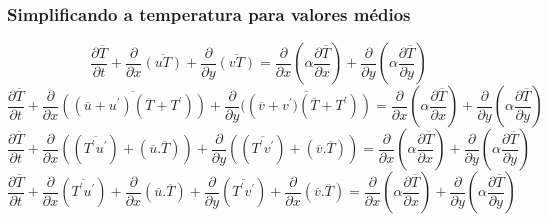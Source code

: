 \documentclass[xcolor=dvipsnames,10pt,aspectratio=169]{beamer}
\begin{document}
	
	
	
	
		\begin{frame}
		\frametitle{Simplificando a temperatura para valores médios}
		\begin{equation}
		\frac{\partial \overline{T}}{\partial t} + {\frac{\partial{}}{\partial{x}} \overline{(uT)}} + 
		{\frac{\partial{}}{\partial{y}} \overline{(vT)}} 
		=
		{\frac{\partial{}}{\partial{x}}} \left(\alpha {\frac{\partial{\overline{T}}}{\partial{x}}} \right) +
		{\frac{\partial{}}{\partial{y}}} \left(\alpha {\frac{\partial{\overline{T}}}{\partial{y}}} \right) 
		\end{equation}
		\begin{equation}\label{equation_mean}
		\frac{\partial \overline{T}}{\partial t} +{\frac{\partial{}}{\partial{x}} \overline{\left((\overline{u} + u^\prime) (\overline{T} + T^\prime) \right)}} + 
		{\frac{\partial{}}{\partial{y}} \overline{(\left(\overline{v} + v^\prime) (\overline{T} + T^\prime) \right)}} 
		=
		{\frac{\partial{}}{\partial{x}}} \left(\alpha {\frac{\partial{\overline{T}}}{\partial{x}}} \right) +
		{\frac{\partial{}}{\partial{y}}} \left(\alpha {\frac{\partial{\overline{T}}}{\partial{y}}} \right) 
		\end{equation}
		\begin{equation}
		\frac{\partial \overline{T}}{\partial t} +\frac{\partial{}}{\partial{x}} \left(\left(\overline{T^\prime u^\prime}\right) + \left(\overline{u}.\overline{T}\right)\right)     + 
		\frac{\partial{}}{\partial{y}} \left(\left(\overline{T^\prime v^\prime}\right) + \left(\overline{v}.\overline{T}\right)\right) 
		=
		{\frac{\partial{}}{\partial{x}}} \left(\alpha {\frac{\partial{\overline{T}}}{\partial{x}}} \right) +
		{\frac{\partial{}}{\partial{y}}} \left(\alpha {\frac{\partial{\overline{T}}}{\partial{y}}} \right) 
		\end{equation}
		\begin{equation}\label{equation_preparede}
		\frac{\partial \overline{T}}{\partial t} +\frac{\partial{}}{\partial{x}} \left(\overline{T^\prime u^\prime}\right) + \frac{\partial{}}{\partial{x}}\left(\overline{u}.\overline{T}\right)     + 
		\frac{\partial{}}{\partial{y}} \left(\overline{T^\prime v^\prime}\right) + \frac{\partial{}}{\partial{x}}\left(\overline{v}.\overline{T}\right) 
		=
		{\frac{\partial{}}{\partial{x}}} \left(\alpha {\frac{\partial{\overline{T}}}{\partial{x}}} \right) +
		{\frac{\partial{}}{\partial{y}}} \left(\alpha {\frac{\partial{\overline{T}}}{\partial{y}}} \right) 
		\end{equation}
		\end{frame}
		
\end{document}
